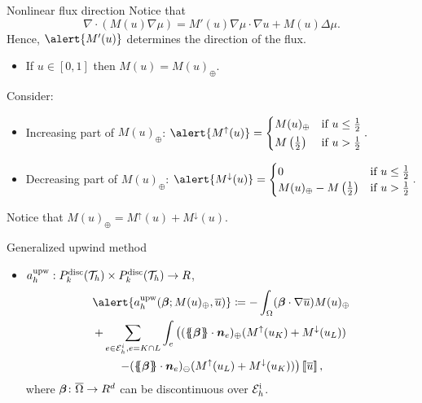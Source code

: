 \begin{frame}{Nonlinear flux direction}
	\footnotesize
	Notice that
	$$\nabla\cdot(M(u)\nabla\mu)=M'(u)\nabla\mu \cdot\nabla u+M(u)\Delta\mu.$$
	Hence, $\alert{M'(u)}$ determines the direction of the flux.
	
	\vspace*{0.3cm}
	\begin{itemize}
		\item If $u\in[0,1]$ then $M(u)=M(u)_\oplus$.
	\end{itemize}
	\vspace*{0.3cm}
	
	Consider:
	\begin{itemize}
		\item Increasing part of $M(u)_\oplus$: $\alert{M^\uparrow(u)}=
		\begin{cases}
			M(u)_{\oplus} & \text{if }u\le \frac{1}{2}\\[0.2em]
			M\left(\frac{1}{2}\right) & \text{if } u>\frac{1}{2}
		\end{cases}.$
		\item Decreasing part of $M(u)_\oplus$: $
		\alert{M^\downarrow(u)}=
		\begin{cases}
			0 & \text{if }u\le \frac{1}{2}\\
			M(u)_{\oplus}-M\left(\frac{1}{2}\right) & \text{if } u>\frac{1}{2}
		\end{cases}.$
	\end{itemize}
	Notice that $M(u)_\oplus=M^\uparrow(u)+M^\downarrow(u)$.
\end{frame}

\begin{frame}{Generalized upwind method}
	\vspace*{-0.1cm}
	\begin{itemize}\itemsep1em
		\item $a_h^{\text{upw}}:\relax{P}^{\text{disc}}_k(\mathcal{T}_h)\times \relax{P}^{\text{disc}}_k(\mathcal{T}_h)\to\relax R$,
		\begin{multline*}
				\alert{\aupw{\bbeta}{M(u)_\oplus}{\bu}}\coloneqq-\int_\Omega (\bbeta\cdot\nabla\overline{u})M(u)_{\oplus}\\+\sum_{e\in\E_h^i,e=K\cap L}\int_e\left((\media{\bbeta}\cdot\nn_e)_{\oplus}(M^\uparrow(\uK)+M^\downarrow(\uL))\right.\\\left.-(\media{\bbeta}\cdot\nn_e)_{\ominus}(M^\uparrow(\uL)+M^\downarrow(\uK))\right)\salto{\bu},
		\end{multline*}
		where $\boldsymbol{\beta}\colon\overline{\Omega}\to\relax R^d$ can be discontinuous over $\mathcal{E}_h^{\text{i}}$.
	\end{itemize}
	
\end{frame}

